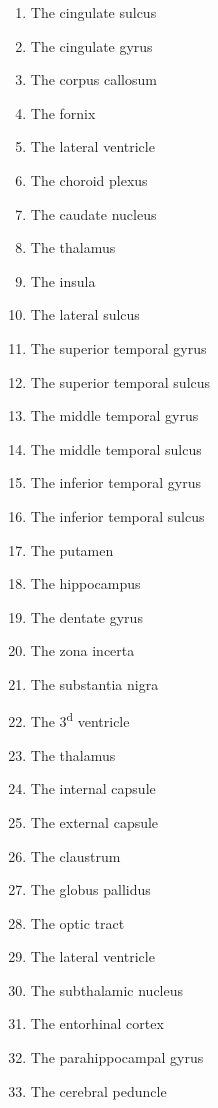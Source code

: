 \documentclass[]{book}
\providecommand{\tightlist}{%
  \setlength{\itemsep}{0pt}\setlength{\parskip}{0pt}}
\begin{document}
\begin{enumerate}
\def\labelenumi{\arabic{enumi}.}
\tightlist
\item
  The cingulate sulcus
\item
  The cingulate gyrus
\item
  The corpus callosum
\item
  The fornix
\item
  The lateral ventricle
\item
  The choroid plexus
\item
  The caudate nucleus
\item
  The thalamus
\item
  The insula
\item
  The lateral sulcus
\item
  The superior temporal gyrus
\item
  The superior temporal sulcus
\item
  The middle temporal gyrus
\item
  The middle temporal sulcus
\item
  The inferior temporal gyrus
\item
  The inferior temporal sulcus
\item
  The putamen
\item
  The hippocampus
\item
  The dentate gyrus
\item
  The zona incerta
\item
  The substantia nigra
\item
  The 3\textsuperscript{d} ventricle
\item
  The thalamus
\item
  The internal capsule
\item
  The external capsule
\item
  The claustrum
\item
  The globus pallidus
\item
  The optic tract
\item
  The lateral ventricle
\item
  The subthalamic nucleus
\item
  The entorhinal cortex
\item
  The parahippocampal gyrus
\item
  The cerebral peduncle
\end{enumerate}
\end{document}
